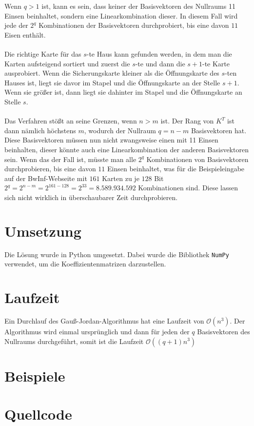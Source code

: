 \documentclass[a4paper,10pt,ngerman]{scrartcl}
\begin{document}
Wenn $q>1$ ist, kann es sein, dass keiner der Basisvektoren des Nullraums 11 Einsen beinhaltet, sondern eine Linearkombination dieser. In diesem Fall wird jede der $2^q$ Kombinationen der Basisvektoren durchprobiert, bis eine davon $11$ Eisen enthält.\\\\
Die richtige Karte für das $s$-te Haus kann gefunden werden, in dem man die Karten aufsteigend sortiert und zuerst die $s$-te und dann die $s+1$-te Karte ausprobiert. Wenn die Sicherungskarte kleiner als die Öffnungskarte des $s$-ten Hauses ist, liegt sie davor im Stapel und die Öffnungskarte an der Stelle $s+1$. Wenn sie größer ist, dann liegt sie dahinter im Stapel und die Öffnungskarte an Stelle $s$.\\
\\
Das Verfahren stößt an seine Grenzen, wenn $n>m$ ist. Der Rang von $K^T$ ist dann nämlich höchstens $m$, wodurch der Nullraum $q=n-m$ Basisvektoren hat. Diese Basisvektoren müssen nun nicht zwangsweise einen mit 11 Einsen beinhalten, dieser könnte auch eine Linearkombination der anderen Basisvektoren sein. Wenn das der Fall ist, müsste man alle $2^q$ Kombinationen von Basisvektoren durchprobieren, bis eine davon $11$ Einsen beinhaltet, was für die Beispieleingabe auf der BwInf-Webseite mit $161$ Karten zu je $128$ Bit $2^q=2^{n-m}=2^{161-128}=2^{33}=8.589.934.592$ Kombinationen sind. Diese lassen sich nicht wirklich in überschaubarer Zeit durchprobieren.
\section{Umsetzung}
Die Lösung wurde in Python umgesetzt. Dabei wurde die Bibliothek \lstinline|NumPy| verwendet, um die Koeffizientenmatrizen darzustellen. 
\section{Laufzeit}
Ein Durchlauf des Gauß-Jordan-Algorithmus hat eine Laufzeit von $\mathcal{O}(n^3)$. Der Algorithmus wird einmal ursprünglich und dann für jeden der $q$ Basisvektoren des Nullraums durchgeführt, somit ist die Laufzeit $\mathcal{O}((q+1)n^3)$
\section{Beispiele}

\section{Quellcode}



\end{document}

